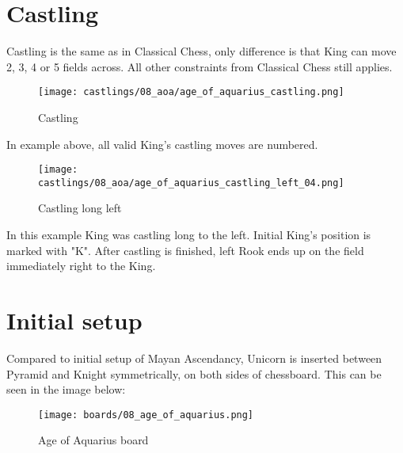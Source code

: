 \clearpage %

\section*{Castling}
\label{sec:Age of Aquarius/Castling}

Castling is the same as in Classical Chess, only difference is that King can move 2, 3, 4 or 5 fields across.
All other constraints from Classical Chess still applies.

\noindent
\begin{figure}[!h]
\texttt{[image: castlings/08\_aoa/age\_of\_aquarius\_castling.png]}
\caption{Castling}
\label{fig:age_of_aquarius_castling}
\end{figure}

In example above, all valid King's castling moves are numbered.

\noindent
\begin{figure}[!h]
\texttt{[image: castlings/08\_aoa/age\_of\_aquarius\_castling\_left\_04.png]}
\caption{Castling long left}
\label{fig:age_of_aquarius_castling_left_04}
\end{figure}

In this example King was castling long to the left. Initial King's position is marked with "K".
After castling is finished, left Rook ends up on the field immediately right to the King.

\clearpage %

\section*{Initial setup}
\label{sec:Age of Aquarius/Initial setup}

Compared to initial setup of Mayan Ascendancy, Unicorn is inserted between Pyramid and Knight
symmetrically, on both sides of chessboard. This can be seen in the image below:

\noindent
\begin{figure}[h]
\texttt{[image: boards/08\_age\_of\_aquarius.png]}
\caption{Age of Aquarius board}
\label{fig:08_age_of_aquarius}
\end{figure}

\clearpage %
